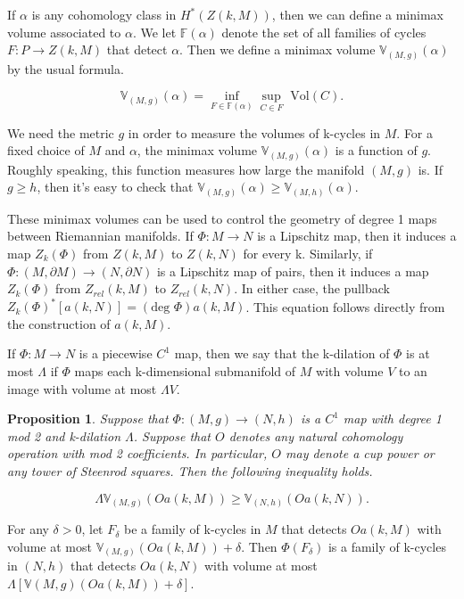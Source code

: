 \documentclass{amsart}
\newtheorem*{Theorem 1}{Theorem 1}
\newtheorem*{Theorem 2}{Theorem 2}
\newtheorem*{Theorem 1A}{Theorem 1A}
\newtheorem*{Theorem 2A}{Theorem 2A}
\newtheorem{prop}{Proposition}[section]
\newtheorem*{vanishing lemma}{Vanishing Lemma}
\numberwithin{equation}{section}
\begin{document}
If $\alpha$ is any cohomology class in $H^*(Z(k,M))$, then we can
define a minimax volume associated to $\alpha$.  We let
$\mathbb{F}(\alpha)$ denote the set of all families of cycles $F:
P \rightarrow Z(k,M)$ that detect $\alpha$.  Then we define a
minimax volume $\mathbb{V}_{(M, g)}(\alpha)$ by the usual
formula.

$$\mathbb{V}_{(M, g)}(\alpha) = \inf_{F \in \mathbb{F}(\alpha)} \sup_{C \in F} \textrm{ Vol}(C).$$

\noindent We need the metric $g$ in order to measure the volumes of k-cycles in $M$.  For
a fixed choice of $M$ and $\alpha$, the minimax volume $\mathbb{V}_{(M, g)}(\alpha)$ is
a function of $g$.  Roughly speaking, this function measures how large the manifold $(M,g)$ is.
If $g \ge h$, then it's easy to check that $\mathbb{V}_{(M,g)}(\alpha) \ge \mathbb{V}_{(M,h)}(\alpha)$.

These minimax volumes can be used to control the geometry of degree 1 maps between
Riemannian manifolds.  If $\Phi: M \rightarrow N$ is a Lipschitz map, then it induces a 
map $Z_k(\Phi)$ from $Z(k, M)$ to $Z(k, N)$ for every k.  Similarly, if $\Phi: 
(M, \partial M) \rightarrow (N, \partial N)$ is
a Lipschitz map of pairs, then it induces a map $Z_k(\Phi)$ from $Z_{rel}(k, M)$ to 
$Z_{rel}(k, N)$.  In either case, the pullback $Z_k(\Phi)^* 
[a(k,N)] = (\textrm{deg } \Phi) a(k,M)$.  This equation
follows directly from the construction of $a(k, M)$.

If $\Phi: M \rightarrow N$ is a piecewise $C^1$ map, then we 
say that the k-dilation of $\Phi$ is at most $\Lambda$
if $\Phi$ maps each k-dimensional submanifold of $M$ with 
volume $V$ to an image with volume at most $\Lambda V$.

\begin{prop} Suppose that $\Phi: (M,g) \rightarrow (N,h)$ is a $C^1$ map with degree 1 mod 2 and
k-dilation $\Lambda$.  Suppose that $O$ denotes any natural cohomology operation with mod 2
coefficients.  In particular, $O$ may denote a cup power or any tower of Steenrod squares.
Then the following inequality holds.

$$\Lambda \mathbb{V}_{(M,g)}(O a(k,M)) \ge \mathbb{V}_{(N,h)}(O a(k, N)).$$

\end{prop}

\proof For any $\delta > 0$, let $F_\delta$ be a family of k-cycles in $M$ that detects $O a(k,M)$ 
with volume at most $\mathbb{V}_{(M,g)}(O a(k,M)) + \delta$.  Then $\Phi(F_\delta)$ is a family of k-cycles in 
$(N,h)$ that detects $O a(k,N)$ with volume at most $\Lambda [\mathbb{V}{(M,g)}(O a(k,M)) +
\delta]$. \endproof
\end{document}
